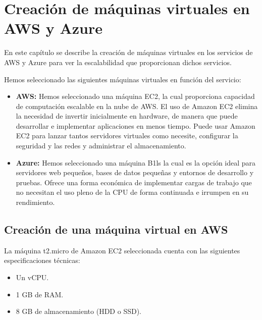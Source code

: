 \chapter{Creación de máquinas virtuales en AWS y Azure}
En este capítulo se describe la creación de máquinas virtuales en los servicios de AWS y Azure para ver la escalabilidad que proporcionan dichos servicios.

Hemos seleccionado las siguientes máquinas virtuales en función del servicio:
\begin{itemize}
	\item \textbf{AWS:} Hemos seleccionado una máquina EC2, la cual proporciona capacidad de computación escalable en la nube de AWS. El uso de Amazon EC2 elimina la necesidad de invertir inicialmente en hardware, de manera que puede desarrollar e implementar aplicaciones en menos tiempo. Puede usar Amazon EC2 para lanzar tantos servidores virtuales como necesite, configurar la seguridad y las redes y administrar el almacenamiento.
	\item \textbf{Azure:} Hemos seleccionado una máquina B1ls la cual es la opción ideal para servidores web pequeños, bases de datos pequeñas y entornos de desarrollo y pruebas. Ofrece una forma económica de implementar cargas de trabajo que no necesitan el uso pleno de la CPU de forma continuada e irrumpen en su rendimiento.
\end{itemize}
\section{Creación de una máquina virtual en AWS}
La máquina t2.micro de Amazon EC2 seleccionada cuenta con las siguientes especificaciones técnicas:
\begin{itemize}
	\item Un vCPU.
	\item 1 GB de RAM.
	\item 8 GB de almacenamiento (HDD o SSD).
\end{itemize}

